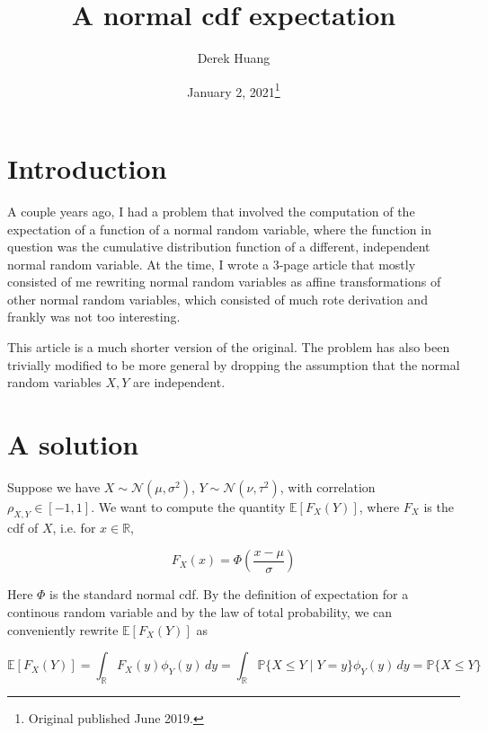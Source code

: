 \documentclass{article}
\title{A normal cdf expectation}
\author{Derek Huang}
\date{January 2, 2021\thanks{Original published June 2019.}}
\numberwithin{equation}{section}
\begin{document}
\maketitle

\section{Introduction}

A couple years ago, I had a problem that involved the computation of the
expectation of a function of a normal random variable, where the function in
question was the cumulative distribution function of a different, independent
normal random variable. At the time, I wrote a 3-page article that mostly
consisted of me rewriting normal random variables as affine transformations of
other normal random variables, which consisted of much rote derivation and
frankly was not too interesting.

\medskip

This article is a much shorter version of the original. The problem has also
been trivially modified to be more general by dropping the assumption that the
normal random variables $ X, Y $ are independent.

\section{A solution}

Suppose we have $ X \sim \mathcal{N}(\mu, \sigma^2) $,
$ Y \sim \mathcal{N}(\nu, \tau^2) $, with correlation
$ \rho_{X, Y} \in [-1, 1] $. We want to compute the quantity
$ \mathbb{E}[F_X(Y)] $, where $ F_X $ is the cdf of $ X $, i.e. for
$ x \in \mathbb{R} $,

\begin{equation*}
    F_X(x) = \Phi\left(\frac{x - \mu}{\sigma}\right)
\end{equation*}

Here $ \Phi $ is the standard normal cdf. By the definition of expectation for a
continous random variable and by the law of total probability, we can
conveniently rewrite $ \mathbb{E}[F_X(Y)] $ as

\begin{equation*}
    \mathbb{E}[F_X(Y)] = \int_\mathbb{R}F_X(y)\phi_Y(y)\,dy =
    \int_\mathbb{R}\mathbb{P}\{X \le Y \mid Y = y\}\phi_Y(y)\,dy =
    \mathbb{P}\{X \le Y\}
\end{equation*}
\end{document}
